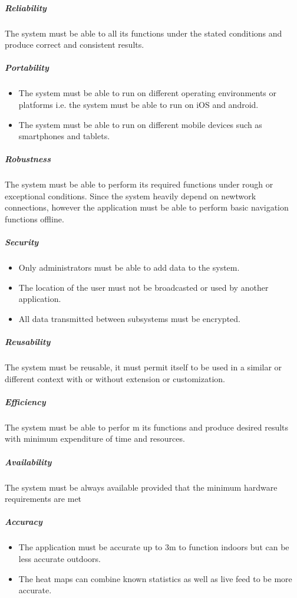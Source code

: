 \documentclass[english]{article}
\begin{document}
				\subparagraph{Reliability}
    				The system must be able to all its functions under the stated conditions and produce correct and consistent results. 
    				
    			\subparagraph{Portability}
    				\begin{itemize}
        				\item The system must be able to run on different operating environments or platforms i.e. the system must be able to run on iOS and android.
        				\item The system must be able to run on different mobile devices such as smartphones and tablets.
    				\end{itemize}
    				
    			\subparagraph{Robustness}
    				The system must be able to perform its required functions under rough or exceptional conditions. Since the system heavily depend on newtwork connections, however the application must be able to perform basic navigation functions offline.
    				
				\subparagraph{Security}
    				\begin{itemize}
        				\item Only administrators must be able to add data to the system.
        				\item The location of the user must not be broadcasted or used by another application. 
        				\item All data transmitted between subsystems must be encrypted.
    				\end{itemize}
    				
				\subparagraph{Reusability}
				    The system must be reusable, it must permit itself to be used in a similar or different context with or without extension or customization.
				    
				\subparagraph{Efficiency}
				    The system must be able to perfor m its functions and produce desired results with minimum expenditure of time and resources.
				    
				\subparagraph{Availability}
				    The system must be always available provided that the minimum hardware requirements are met
    				    
				\subparagraph{Accuracy}
    				\begin{itemize}
							\item
							The application must be accurate up to 3m to function indoors but can be less accurate outdoors.
							\item
							The heat maps can combine known statistics as well as live feed to be more accurate. 
						\end{itemize}
						
\end{document}
